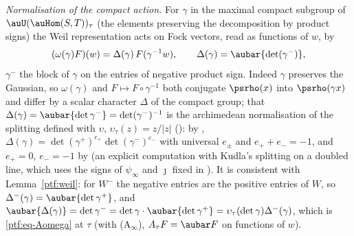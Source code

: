 \documentclass[10pt]{amsart}
\theoremstyle{definition}
\theoremstyle{remark}
\begin{document}
\emph{Normalisation of the compact action.} For $\gamma$ in the maximal compact subgroup of
$\auU(\auHom(S,T))_\tau$ (the elements preserving the decomposition by product signs) the Weil
representation acts on Fock vectors, read as functions of $w$, by
\begin{equation}\label{ptf:eq-compact}
(\omega(\gamma)F)(w)=\Delta(\gamma)\,F(\gamma^{-1}w),\qquad\Delta(\gamma)=\aubar{\det(\gamma^-)},
\end{equation}
$\gamma^-$ the block of $\gamma$ on the entries of negative product sign. Indeed $\gamma$ preserves
the Gaussian, so $\omega(\gamma)$ and $F\mapsto F\circ\gamma^{-1}$ both conjugate $\psrho(x)$ into
$\psrho(\gamma x)$ and differ by a scalar character $\Delta$ of the compact group; that $\Delta(\gamma)=
\aubar{\det\gamma^-}=\det(\gamma^-)^{-1}$ is the archimedean normalisation of the splitting defined
with $\upsilon$, $\upsilon_\tau(z)=z/|z|$ ({\cite[\S5.1.1]{P49}}): by {\cite[Lemma~2.20]{P49}},
$\Delta(\gamma)=\det(\gamma^+)^{e_+}\det(\gamma^-)^{e_-}$ with universal $e_\pm$ and $e_++e_-=-1$, and
$e_+=0$, $e_-=-1$ by {\cite[Proposition~2.21]{P49}} (an explicit computation with Kudla's splitting on a
doubled line, which uses the signs of $\psi_\infty$ and $\jmath$ fixed in {\cite[\S5.1.1]{P49}}). It is consistent with
Lemma~\ref{ptf:weil}: for $W^-$ the negative entries are the positive entries of $W$, so $\Delta^-(\gamma)=
\aubar{\det\gamma^+}$, and $\aubar{\Delta(\gamma)}=\det\gamma^-=\det\gamma\cdot\aubar{\det\gamma^+}=\upsilon_\tau(\det\gamma)
\Delta^-(\gamma)$, which is \eqref{ptf:eq-Aomega} at $\tau$ (with (A$_\infty$), $A_\tau F=\aubar F$ on
functions of $w$).
\end{document}
